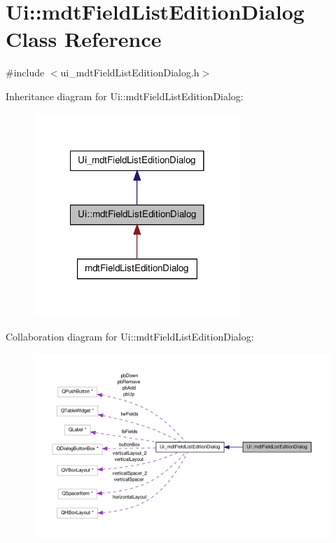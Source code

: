 \hypertarget{class_ui_1_1mdt_field_list_edition_dialog}{\section{Ui\-:\-:mdt\-Field\-List\-Edition\-Dialog Class Reference}
\label{class_ui_1_1mdt_field_list_edition_dialog}
}


{\ttfamily \#include $<$ui\-\_\-mdt\-Field\-List\-Edition\-Dialog.\-h$>$}



Inheritance diagram for Ui\-:\-:mdt\-Field\-List\-Edition\-Dialog\-:
\nopagebreak
\begin{figure}[H]
\begin{center}
\leavevmode
\includegraphics[width=222pt]{class_ui_1_1mdt_field_list_edition_dialog__inherit__graph}
\end{center}
\end{figure}


Collaboration diagram for Ui\-:\-:mdt\-Field\-List\-Edition\-Dialog\-:
\nopagebreak
\begin{figure}[H]
\begin{center}
\leavevmode
\includegraphics[width=350pt]{class_ui_1_1mdt_field_list_edition_dialog__coll__graph}
\end{center}
\end{figure}
